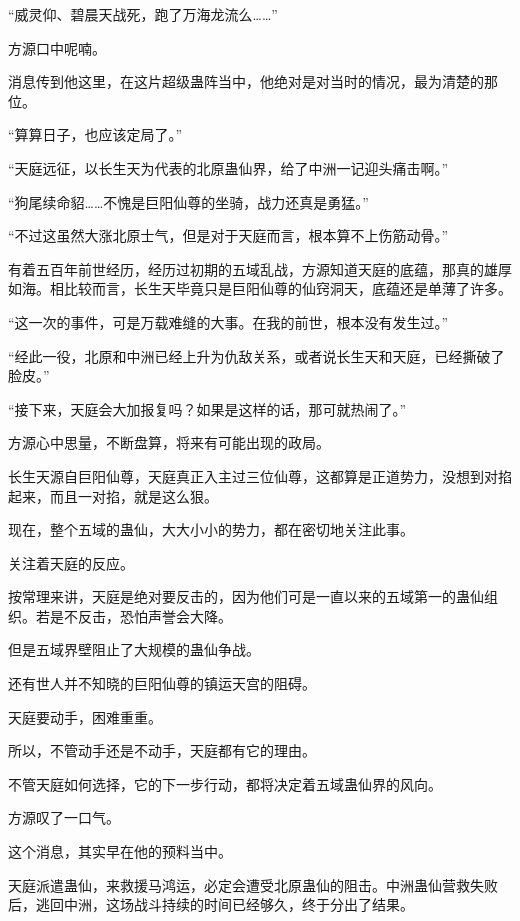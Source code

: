 
\begin{this_body}

“威灵仰、碧晨天战死，跑了万海龙流么……”

方源口中呢喃。

消息传到他这里，在这片超级蛊阵当中，他绝对是对当时的情况，最为清楚的那位。

“算算日子，也应该定局了。”

“天庭远征，以长生天为代表的北原蛊仙界，给了中洲一记迎头痛击啊。”

“狗尾续命貂……不愧是巨阳仙尊的坐骑，战力还真是勇猛。”

“不过这虽然大涨北原士气，但是对于天庭而言，根本算不上伤筋动骨。”

有着五百年前世经历，经历过初期的五域乱战，方源知道天庭的底蕴，那真的雄厚如海。相比较而言，长生天毕竟只是巨阳仙尊的仙窍洞天，底蕴还是单薄了许多。

“这一次的事件，可是万载难缝的大事。在我的前世，根本没有发生过。”

“经此一役，北原和中洲已经上升为仇敌关系，或者说长生天和天庭，已经撕破了脸皮。”

“接下来，天庭会大加报复吗？如果是这样的话，那可就热闹了。”

方源心中思量，不断盘算，将来有可能出现的政局。

长生天源自巨阳仙尊，天庭真正入主过三位仙尊，这都算是正道势力，没想到对掐起来，而且一对掐，就是这么狠。

现在，整个五域的蛊仙，大大小小的势力，都在密切地关注此事。

关注着天庭的反应。

按常理来讲，天庭是绝对要反击的，因为他们可是一直以来的五域第一的蛊仙组织。若是不反击，恐怕声誉会大降。

但是五域界壁阻止了大规模的蛊仙争战。

还有世人并不知晓的巨阳仙尊的镇运天宫的阻碍。

天庭要动手，困难重重。

所以，不管动手还是不动手，天庭都有它的理由。

不管天庭如何选择，它的下一步行动，都将决定着五域蛊仙界的风向。

方源叹了一口气。

这个消息，其实早在他的预料当中。

天庭派遣蛊仙，来救援马鸿运，必定会遭受北原蛊仙的阻击。中洲蛊仙营救失败后，逃回中洲，这场战斗持续的时间已经够久，终于分出了结果。


\end{this_body}
